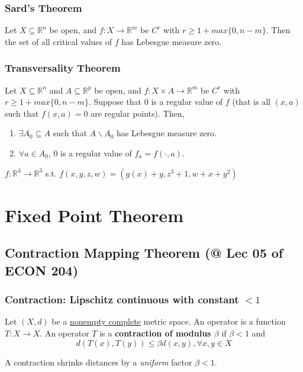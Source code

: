 \documentclass[11pt]{elegantbook}
\begin{document}
\subsection{Sard's Theorem}
\begin{theorem}
    Let $X \subseteq \mathbb{R}^n$ be open, and $f : X \rightarrow \mathbb{R}^m$ be $C^r$ with $r \geq 1 + max\{0, n - m\}$. Then the set of all critical values of $f$ has Lebesgue measure zero.
\end{theorem}

\subsection{Transversality Theorem}
\begin{theorem}
    Let $X \subseteq \mathbb{R}^n$ and $A \subseteq \mathbb{R}^p$ be open, and $f : X \times A \rightarrow \mathbb{R}^m$ be $C^r$ with $r \geq 1 + max\{0, n - m\}$. Suppose that $0$ is a regular value of $f$ (that is all $(x,a)$ such that $f(x,a)=0$ are regular points). Then,
    \begin{enumerate}
        \item $\exists A_0 \subseteq A$ such that $A \backslash A_0$ has Lebesgue measure zero.
        \item $\forall a \in A_0$, $0$ is a regular value of $f_a = f(\cdot, a)$.
    \end{enumerate}
\end{theorem}
\begin{example}
    $f: \mathbb{R}^4 \rightarrow \mathbb{R}^3$ s.t. $f(x,y,z,w)=(g(x)+y,z^3+1,w+x+y^2)$
\end{example}


\chapter{Fixed Point Theorem}

\section{Contraction Mapping Theorem \small{(@ Lec 05 of ECON 204)}}
\subsection{Contraction: Lipschitz continuous with constant $<1$}
\begin{definition}
    \normalfont
    Let $(X, d)$ be a \underline{nonempty complete} metric space. An operator is a function $T : X \rightarrow X$. An operator $T$ is a \textbf{contraction of modulus $\beta$} if $\beta < 1$ and $$d(T(x), T(y)) \leq \beta d(x, y), \forall x,y\in X$$
\end{definition}
A contraction shrinks distances by a \textit{uniform} factor $\beta < 1$.
\end{document}
